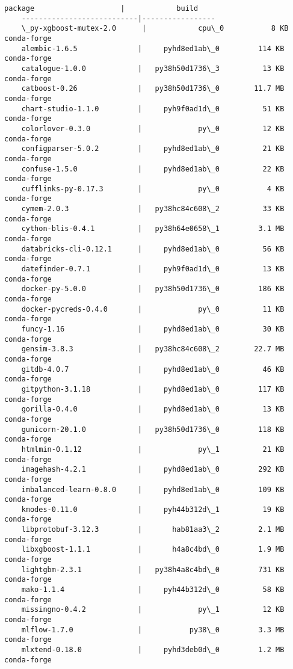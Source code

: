\documentclass[11pt]{article}
\begin{document}
\begin{Verbatim}[commandchars=\\\{\}]
    package                    |            build
    ---------------------------|-----------------
    \_py-xgboost-mutex-2.0      |            cpu\_0           8 KB  conda-forge
    alembic-1.6.5              |     pyhd8ed1ab\_0         114 KB  conda-forge
    catalogue-1.0.0            |   py38h50d1736\_3          13 KB  conda-forge
    catboost-0.26              |   py38h50d1736\_0        11.7 MB  conda-forge
    chart-studio-1.1.0         |     pyh9f0ad1d\_0          51 KB  conda-forge
    colorlover-0.3.0           |             py\_0          12 KB  conda-forge
    configparser-5.0.2         |     pyhd8ed1ab\_0          21 KB  conda-forge
    confuse-1.5.0              |     pyhd8ed1ab\_0          22 KB  conda-forge
    cufflinks-py-0.17.3        |             py\_0           4 KB  conda-forge
    cymem-2.0.3                |   py38hc84c608\_2          33 KB  conda-forge
    cython-blis-0.4.1          |   py38h64e0658\_1         3.1 MB  conda-forge
    databricks-cli-0.12.1      |     pyhd8ed1ab\_0          56 KB  conda-forge
    datefinder-0.7.1           |     pyh9f0ad1d\_0          13 KB  conda-forge
    docker-py-5.0.0            |   py38h50d1736\_0         186 KB  conda-forge
    docker-pycreds-0.4.0       |             py\_0          11 KB  conda-forge
    funcy-1.16                 |     pyhd8ed1ab\_0          30 KB  conda-forge
    gensim-3.8.3               |   py38hc84c608\_2        22.7 MB  conda-forge
    gitdb-4.0.7                |     pyhd8ed1ab\_0          46 KB  conda-forge
    gitpython-3.1.18           |     pyhd8ed1ab\_0         117 KB  conda-forge
    gorilla-0.4.0              |     pyhd8ed1ab\_0          13 KB  conda-forge
    gunicorn-20.1.0            |   py38h50d1736\_0         118 KB  conda-forge
    htmlmin-0.1.12             |             py\_1          21 KB  conda-forge
    imagehash-4.2.1            |     pyhd8ed1ab\_0         292 KB  conda-forge
    imbalanced-learn-0.8.0     |     pyhd8ed1ab\_0         109 KB  conda-forge
    kmodes-0.11.0              |     pyh44b312d\_1          19 KB  conda-forge
    libprotobuf-3.12.3         |       hab81aa3\_2         2.1 MB  conda-forge
    libxgboost-1.1.1           |       h4a8c4bd\_0         1.9 MB  conda-forge
    lightgbm-2.3.1             |   py38h4a8c4bd\_0         731 KB  conda-forge
    mako-1.1.4                 |     pyh44b312d\_0          58 KB  conda-forge
    missingno-0.4.2            |             py\_1          12 KB  conda-forge
    mlflow-1.7.0               |           py38\_0         3.3 MB  conda-forge
    mlxtend-0.18.0             |     pyhd3deb0d\_0         1.2 MB  conda-forge

\end{Verbatim}
\end{document}
